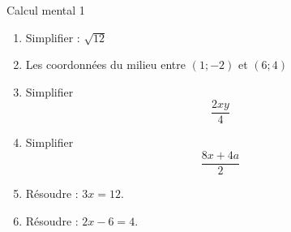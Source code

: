 \documentclass{beamer}
\begin{document}
\begin{frame}{Calcul mental 1}

    \pause
    \begin{enumerate}
        \item
            Simplifier : \( \sqrt{12}\)


            \pause
        \item
            Les coordonnées du milieu entre \( (1;-2)\) et \( (6;4)\)
            \pause
        \item
            Simplifier 
            \begin{equation*}
                \frac{ 2xy }{ 4 }
            \end{equation*}
            \pause
        \item
            Simplifier
            \begin{equation*}
                \frac{ 8x+4a }{ 2 }
            \end{equation*}
            \pause
        \item
            Résoudre : \( 3x=12\).
            \pause
        \item
            Résoudre : \( 2x-6=4\).
    \end{enumerate}

\end{frame}
\end{document}
